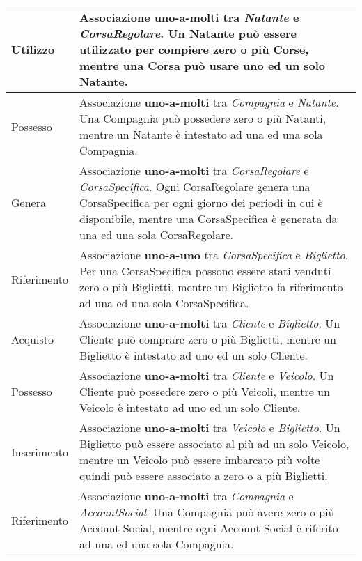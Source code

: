 \begin{longtable}{|| m{} | m{} ||}
     Utilizzo & Associazione \textbf{uno-a-molti} tra \textit{Natante} e \textit{CorsaRegolare}. 
     Un Natante può essere utilizzato per compiere zero o più Corse, mentre una Corsa può usare uno ed un solo Natante.\\
     \hline

     Possesso & Associazione \textbf{uno-a-molti} tra \textit{Compagnia} e \textit{Natante}. 
     Una Compagnia può possedere zero o più Natanti, mentre un Natante è intestato ad una ed una sola Compagnia.\\
     \hline

     Genera & Associazione \textbf{uno-a-molti} tra \textit{CorsaRegolare} e \textit{CorsaSpecifica}.
     Ogni CorsaRegolare genera una CorsaSpecifica per ogni giorno dei periodi in cui è disponibile, mentre una CorsaSpecifica è generata da una ed una sola CorsaRegolare.\\
     \hline

     Riferimento & Associazione \textbf{uno-a-uno} tra \textit{CorsaSpecifica} e \textit{Biglietto}. 
     Per una CorsaSpecifica possono essere stati venduti zero o più Biglietti, mentre un Biglietto fa riferimento ad una ed una sola CorsaSpecifica.\\
     \hline

     Acquisto & Associazione \textbf{uno-a-molti} tra \textit{Cliente} e \textit{Biglietto}. 
     Un Cliente può comprare zero o più Biglietti, mentre un Biglietto è intestato ad uno ed un solo Cliente.\\
     \hline

     Possesso & Associazione \textbf{uno-a-molti} tra \textit{Cliente} e \textit{Veicolo}. 
     Un Cliente può possedere zero o più Veicoli, mentre un Veicolo è intestato ad uno ed un solo Cliente.\\
     \hline

     Inserimento & Associazione \textbf{uno-a-molti} tra \textit{Veicolo} e \textit{Biglietto}. 
     Un Biglietto può essere associato al più ad un solo Veicolo, mentre un Veicolo può essere imbarcato più volte quindi può essere associato a zero o a più Biglietti.\\
     \hline

     Riferimento & Associazione \textbf{uno-a-molti} tra \textit{Compagnia} e \textit{AccountSocial}. 
     Una Compagnia può avere zero o più Account Social, mentre ogni Account Social è riferito ad una ed una sola Compagnia.\\
     \hline

     \hline\hline

\end{longtable}